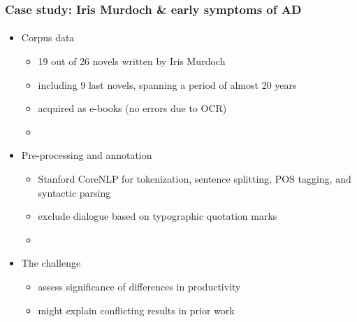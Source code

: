 \documentclass[t]{beamer} %
\begin{document}
\begin{frame}
  \frametitle{Case study: Iris Murdoch \& early symptoms of AD}
  \framesubtitle{\citep{Evert:Wankerl:Noeth:17}}

  \begin{itemize}
  \item Corpus data
    \begin{itemize}
    \item 19 out of 26 novels written by Iris Murdoch
    \item including 9 last novels, spanning a period of almost 20 years
    \item acquired as e-books (no errors due to OCR)
    \item[]
    \end{itemize}
  \item Pre-processing and annotation
    \begin{itemize}
    \item Stanford CoreNLP \citep{Manning:etc:14} for tokenization, sentence
      splitting, POS tagging, and syntactic parsing
    \item exclude dialogue based on typographic quotation marks
      \citep[following][]{Garrard:etc:05,Pakhomov:etc:11}
    \item[]
    \end{itemize}
  \item The challenge
    \begin{itemize}
    \item[\hand] assess significance of differences in productivity 
    \item[\hand] might explain conflicting results in prior work
    \end{itemize}
  \end{itemize}
\end{frame}
\end{document}
